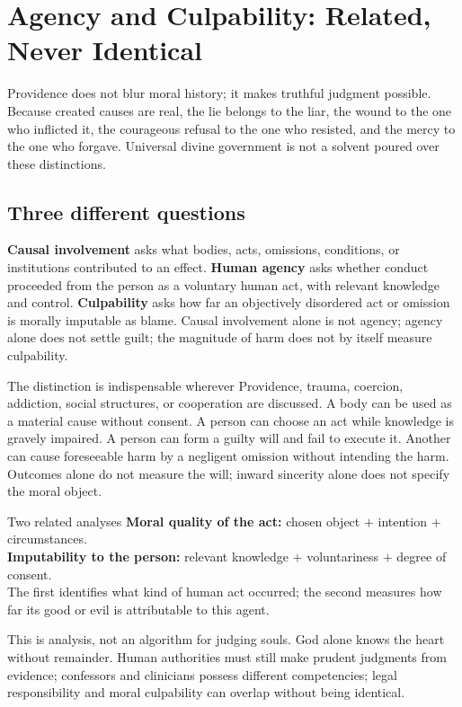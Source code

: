 \section{Agency and Culpability: Related, Never Identical}

Providence does not blur moral history; it makes truthful judgment possible.
Because created causes are real, the lie belongs to the liar, the wound to the
one who inflicted it, the courageous refusal to the one who resisted, and the
mercy to the one who forgave. Universal divine government is not a solvent
poured over these distinctions.

\subsection{Three different questions}

\textbf{Causal involvement} asks what bodies, acts, omissions, conditions, or institutions contributed to an effect. \textbf{Human agency} asks whether conduct proceeded from the person as a voluntary human act, with relevant knowledge and control. \textbf{Culpability} asks how far an objectively disordered act or omission is morally imputable as blame. Causal involvement alone is not agency; agency alone does not settle guilt; the magnitude of harm does not by itself measure culpability.

The distinction is indispensable wherever Providence, trauma, coercion, addiction, social structures, or cooperation are discussed. A body can be used as a material cause without consent. A person can choose an act while knowledge is gravely impaired. A person can form a guilty will and fail to execute it. Another can cause foreseeable harm by a negligent omission without intending the harm. Outcomes alone do not measure the will; inward sincerity alone does not specify the moral object.

\begin{massbox}{Two related analyses}
\textbf{Moral quality of the act:} chosen object $+$ intention $+$ circumstances.\\
\textbf{Imputability to the person:} relevant knowledge $+$ voluntariness $+$ degree of consent.\\
The first identifies what kind of human act occurred; the second measures how far its good or evil is attributable to this agent.
\end{massbox}

This is analysis, not an algorithm for judging souls. God alone knows the heart without remainder. Human authorities must still make prudent judgments from evidence; confessors and clinicians possess different competencies; legal responsibility and moral culpability can overlap without being identical.

